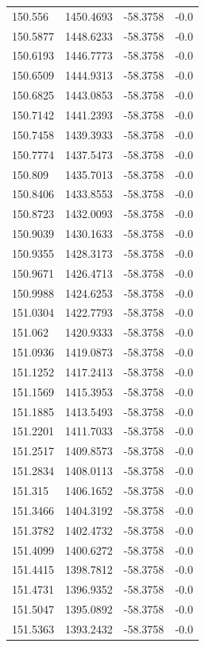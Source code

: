 \begin{table}[H]
\begin{tabular}{llll}
150.556 & 1450.4693 & -58.3758 & -0.0 \\
150.5877 & 1448.6233 & -58.3758 & -0.0 \\
150.6193 & 1446.7773 & -58.3758 & -0.0 \\
150.6509 & 1444.9313 & -58.3758 & -0.0 \\
150.6825 & 1443.0853 & -58.3758 & -0.0 \\
150.7142 & 1441.2393 & -58.3758 & -0.0 \\
150.7458 & 1439.3933 & -58.3758 & -0.0 \\
150.7774 & 1437.5473 & -58.3758 & -0.0 \\
150.809 & 1435.7013 & -58.3758 & -0.0 \\
150.8406 & 1433.8553 & -58.3758 & -0.0 \\
150.8723 & 1432.0093 & -58.3758 & -0.0 \\
150.9039 & 1430.1633 & -58.3758 & -0.0 \\
150.9355 & 1428.3173 & -58.3758 & -0.0 \\
150.9671 & 1426.4713 & -58.3758 & -0.0 \\
150.9988 & 1424.6253 & -58.3758 & -0.0 \\
151.0304 & 1422.7793 & -58.3758 & -0.0 \\
151.062 & 1420.9333 & -58.3758 & -0.0 \\
151.0936 & 1419.0873 & -58.3758 & -0.0 \\
151.1252 & 1417.2413 & -58.3758 & -0.0 \\
151.1569 & 1415.3953 & -58.3758 & -0.0 \\
151.1885 & 1413.5493 & -58.3758 & -0.0 \\
151.2201 & 1411.7033 & -58.3758 & -0.0 \\
151.2517 & 1409.8573 & -58.3758 & -0.0 \\
151.2834 & 1408.0113 & -58.3758 & -0.0 \\
151.315 & 1406.1652 & -58.3758 & -0.0 \\
151.3466 & 1404.3192 & -58.3758 & -0.0 \\
151.3782 & 1402.4732 & -58.3758 & -0.0 \\
151.4099 & 1400.6272 & -58.3758 & -0.0 \\
151.4415 & 1398.7812 & -58.3758 & -0.0 \\
151.4731 & 1396.9352 & -58.3758 & -0.0 \\
151.5047 & 1395.0892 & -58.3758 & -0.0 \\
151.5363 & 1393.2432 & -58.3758 & -0.0 \\

\end{tabular}
\end{table}

